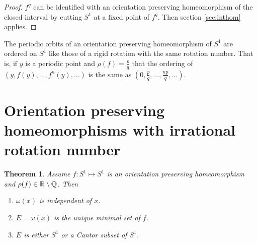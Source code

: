 \documentclass{notes}
\newcommand{\Q}{\mathbb{Q}}
\theoremstyle{plain}
\newtheorem{theorem}[proposition]{Theorem}
\begin{document}
\begin{proof}
  $f^q$ can be identified with an orientation preserving homeomorphism
  of the closed interval by cutting $S^1$ at a fixed point of $f^q$.
  Then section \ref{sec:inthom} applies.
\end{proof}

The periodic orbits of an orientation preserving homeomorphism of $S^1$
are ordered on $S^1$ like those of a rigid rotation with the
same rotation number.  That is, if $y$ is a periodic point and
$\rho(f) = \tfrac{p}{q}$ that the ordering of
$(y,f(y),\dots,f^n(y),\dots)$ is the same as $(0,\tfrac{p}{q},\dots,
\tfrac{np}{q},\dots)$.

\section[Irrational rotation number]%
{Orientation preserving homeomorphisms with irrational rotation number}

\begin{theorem}\label{thm:irromega}
Assume $f \colon S^1 \mapsto S^1$ is an orientation preserving homeomorphism
and $\rho(f) \in \R \setminus \Q$.  Then
\begin{enumerate}
\item $\omega(x)$ is independent of $x$.
\item $E = \omega(x)$ is the unique minimal set of $f$.
\item $E$ is either $S^1$ or a Cantor subset of $S^1$.
\end{enumerate}
\end{theorem}
\end{document}
